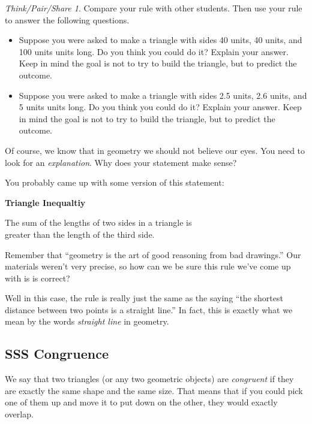 \documentclass[12pt, reqno]{amsart}
\theoremstyle{remark}
\newtheorem*{thinkpair*}{Think/Pair/Share}
\theoremstyle{definition}
\numberwithin{equation}{section}  %
\begin{document}
\bigskip
\bigskip
\bigskip


\begin{thinkpair*}
Compare your rule with other students.  
Then use your rule to answer the following questions.
\begin{itemize}
\item
Suppose you were asked to make a triangle with sides 40 units, 40 units, and 100 units units long. Do you think you could do it? Explain your answer. Keep in mind the goal is not to try to build the triangle, but to predict the outcome.\\
\item
Suppose you were asked to make a triangle with sides 2.5 units, 2.6 units, and 5 units units long. Do you think you could do it? Explain your answer. Keep in mind the goal is not to try to build the triangle, but to predict the outcome.
\end{itemize}
Of course, we know that in geometry we should not believe our eyes.    You need to look for an \emph{explanation}.  Why does your statement make sense?

\end{thinkpair*}

\newpage


You probably came up with some version of this statement:
\begin{center}
{\bf Triangle Inequaltiy}

The sum of the lengths of two sides in a triangle is \\
greater than the length of the third side.
\end{center}

\bigskip

Remember  that   ``geometry is the art of good reasoning from bad drawings.''  Our materials weren't very precise, so how can we be sure this rule we've come up with is is correct?  

Well in this case, the rule is really just the same as the saying ``the shortest distance between two points is a straight line.''  In fact, this is exactly what we mean by the words \emph{straight line} in geometry.  



\newpage

\subsection{SSS Congruence}
We say that two triangles (or any two geometric objects) are \emph{congruent} if they are exactly the same shape and the same size.  That means that if you could pick one of them up and move it to put down on the other, they would exactly overlap.
\end{document}
